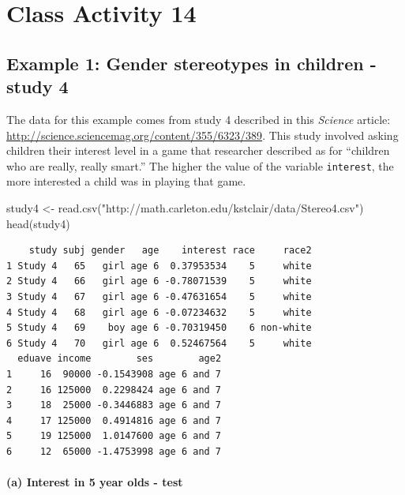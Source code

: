 \documentclass[
]{book}
\newenvironment{Shaded}{\begin{snugshade}}{\end{snugshade}}
\newcommand{\FunctionTok}[1]{\textcolor[rgb]{0.00,0.00,0.00}{#1}}
\newcommand{\NormalTok}[1]{#1}
\newcommand{\OtherTok}[1]{\textcolor[rgb]{0.56,0.35,0.01}{#1}}
\newcommand{\StringTok}[1]{\textcolor[rgb]{0.31,0.60,0.02}{#1}}
\begin{document}
\hypertarget{class-activity-14}{%
\chapter{Class Activity 14}\label{class-activity-14}}

\hypertarget{example-1-gender-stereotypes-in-children---study-4}{%
\section{Example 1: Gender stereotypes in children - study 4}\label{example-1-gender-stereotypes-in-children---study-4}}

The data for this example comes from study 4 described in this \emph{Science} article: \url{http://science.sciencemag.org/content/355/6323/389}. This study involved asking children their interest level in a game that researcher described as for ``children who are really, really smart.'' The higher the value of the variable \texttt{interest}, the more interested a child was in playing that game.

\begin{Shaded}
\begin{Highlighting}[]
\NormalTok{study4 }\OtherTok{\textless{}{-}} \FunctionTok{read.csv}\NormalTok{(}\StringTok{"http://math.carleton.edu/kstclair/data/Stereo4.csv"}\NormalTok{)}
\FunctionTok{head}\NormalTok{(study4)}
\end{Highlighting}
\end{Shaded}

\begin{verbatim}
    study subj gender   age    interest race     race2
1 Study 4   65   girl age 6  0.37953534    5     white
2 Study 4   66   girl age 6 -0.78071539    5     white
3 Study 4   67   girl age 6 -0.47631654    5     white
4 Study 4   68   girl age 6 -0.07234632    5     white
5 Study 4   69    boy age 6 -0.70319450    6 non-white
6 Study 4   70   girl age 6  0.52467564    5     white
  eduave income        ses        age2
1     16  90000 -0.1543908 age 6 and 7
2     16 125000  0.2298424 age 6 and 7
3     18  25000 -0.3446883 age 6 and 7
4     17 125000  0.4914816 age 6 and 7
5     19 125000  1.0147600 age 6 and 7
6     12  65000 -1.4753998 age 6 and 7
\end{verbatim}

\hypertarget{a-interest-in-5-year-olds---test}{%
\subsubsection{(a) Interest in 5 year olds - test}\label{a-interest-in-5-year-olds---test}}
\end{document}

